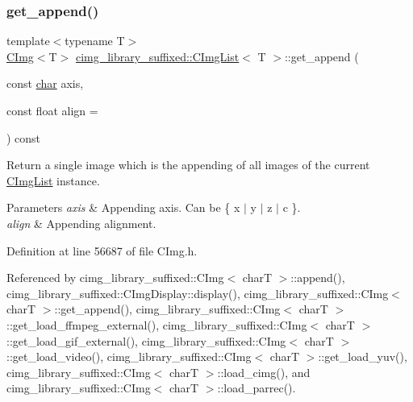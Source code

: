 \subsubsection{\texorpdfstring{get\+\_\+append()}{get\_append()}}
{\footnotesize\ttfamily template$<$typename T$>$ \\
\hyperlink{structcimg__library__suffixed_1_1CImg}{C\+Img}$<$T$>$ \hyperlink{structcimg__library__suffixed_1_1CImgList}{cimg\+\_\+library\+\_\+suffixed\+::\+C\+Img\+List}$<$ T $>$\+::get\+\_\+append (\begin{DoxyParamCaption}\item[{const \hyperlink{classchar}{char}}]{axis,  }\item[{const float}]{align = {} }\end{DoxyParamCaption}) const\hspace{0.3cm}{\ttfamily [inline]}}



Return a single image which is the appending of all images of the current \hyperlink{structcimg__library__suffixed_1_1CImgList}{C\+Img\+List} instance. 


\begin{DoxyParams}{Parameters}
{\em axis} & Appending axis. Can be {\ttfamily \{ \textquotesingle{}x\textquotesingle{} $\vert$ \textquotesingle{}y\textquotesingle{} $\vert$ \textquotesingle{}z\textquotesingle{} $\vert$ \textquotesingle{}c\textquotesingle{} \}}. \\
\hline
{\em align} & Appending alignment. \\
\hline
\end{DoxyParams}


Definition at line 56687 of file C\+Img.\+h.



Referenced by cimg\+\_\+library\+\_\+suffixed\+::\+C\+Img$<$ char\+T $>$\+::append(), cimg\+\_\+library\+\_\+suffixed\+::\+C\+Img\+Display\+::display(), cimg\+\_\+library\+\_\+suffixed\+::\+C\+Img$<$ char\+T $>$\+::get\+\_\+append(), cimg\+\_\+library\+\_\+suffixed\+::\+C\+Img$<$ char\+T $>$\+::get\+\_\+load\+\_\+ffmpeg\+\_\+external(), cimg\+\_\+library\+\_\+suffixed\+::\+C\+Img$<$ char\+T $>$\+::get\+\_\+load\+\_\+gif\+\_\+external(), cimg\+\_\+library\+\_\+suffixed\+::\+C\+Img$<$ char\+T $>$\+::get\+\_\+load\+\_\+video(), cimg\+\_\+library\+\_\+suffixed\+::\+C\+Img$<$ char\+T $>$\+::get\+\_\+load\+\_\+yuv(), cimg\+\_\+library\+\_\+suffixed\+::\+C\+Img$<$ char\+T $>$\+::load\+\_\+cimg(), and cimg\+\_\+library\+\_\+suffixed\+::\+C\+Img$<$ char\+T $>$\+::load\+\_\+parrec().

